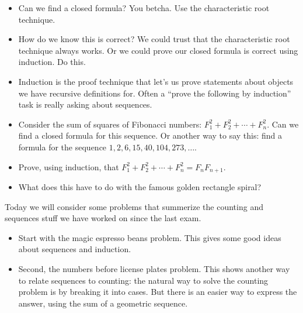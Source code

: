 \documentclass[12pt]{article}
\theoremstyle{plain}
\theoremstyle{definition}
\theoremstyle{remark}
\newcommand{\ex}{\noindent\textbf{Ex:} }
\newcommand{\todayis}[1]{\clearpage{\rhead{\footnotesize #1}}}
\begin{document}
\begin{itemize}
  \item Can we find a closed formula?  You betcha.  Use the characteristic root technique.

  \item How do we know this is correct?  We could trust that the characteristic root technique always works.  Or we could prove our closed formula is correct using induction.  Do this.

  \item Induction is the proof technique that let's us prove statements about objects we have recursive definitions for.  Often a ``prove the following by induction'' task is really asking about sequences.

  \item Consider the sum of squares of Fibonacci numbers: $F_1^2 + F_2^2 + \cdots +F_n^2$.  Can we find a closed formula for this sequence.  Or another way to say this: find a formula for the sequence $1, 2, 6, 15, 40, 104, 273,\ldots$.

  \item Prove, using induction, that $F_1^2 + F_2^2 + \cdots + F_n^2 = F_nF_{n+1}$.

  \item What does this have to do with the famous golden rectangle spiral?
%
%
%
\end{itemize}


\todayis{Monday, November 5}

Today we will consider some problems that summerize the counting and sequences stuff we have worked on since the last exam.

\begin{itemize}
  \item Start with the magic espresso beans problem.  This gives some good ideas about sequences and induction.

  \item Second, the numbers before license plates problem.  This shows another way to relate sequences to counting: the natural way to solve the counting problem is by breaking it into cases.  But there is an easier way to express the answer, using the sum of a geometric sequence.
\end{itemize}
\end{document}
